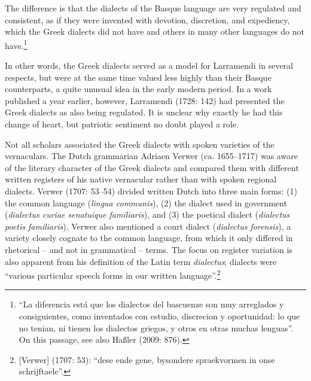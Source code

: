 \begin{styleQuote}
The difference is that the dialects of the Basque language are very regulated and consistent, as if they were invented with devotion, discretion, and expediency, which the Greek dialects did not have and others in many other languages do not have.\footnote{ “La diferencia está que los dialectos del bascuenze son muy arreglados y consiguientes, como inventados con estudio, discrecion y oportunidad: lo que no tenian, ni tienen los dialectos griegos, y otros en otras muchas lenguas”. On this passage, see also Haßler (2009: 876).}
\end{styleQuote}

\begin{styleStandard}
In other words, the Greek dialects served as a model for Larramendi in several respects, but were at the same time valued less highly than their Basque counterparts, a quite unusual idea in the early modern period. In a work published a year earlier, however, Larramendi (1728: 142) had presented the Greek dialects as also being regulated. It is unclear why exactly he had this change of heart, but patriotic sentiment no doubt played a role.
\end{styleStandard}

\begin{styleStandard}
Not all scholars associated the Greek dialects with spoken varieties of the vernaculars. The Dutch grammarian Adriaen Verwer (ca. 1655–1717) was aware of the literary character of the Greek dialects and compared them with different written registers of his native vernacular rather than with spoken regional dialects. Verwer (1707: 53–54) divided written Dutch into three main forms: (1) the common language (\textit{lingua communis}), (2) the dialect used in government (\textit{dialectus curiae senatuique familiaris}), and (3) the poetical dialect (\textit{dialectus poetis familiaris}). Verwer also mentioned a court dialect (\textit{dialectus forensis}), a variety closely cognate to the common language, from which it only differed in rhetorical – and not in grammatical – terms. The focus on register variation is also apparent from his definition of the Latin term \textit{dialectus}; dialects were “various particular speech forms in our written language”.\footnote{ [Verwer] (1707: 53): “dese ende gene, bysondere spraekvormen in onse schrijftaele”.}
\end{styleStandard}

